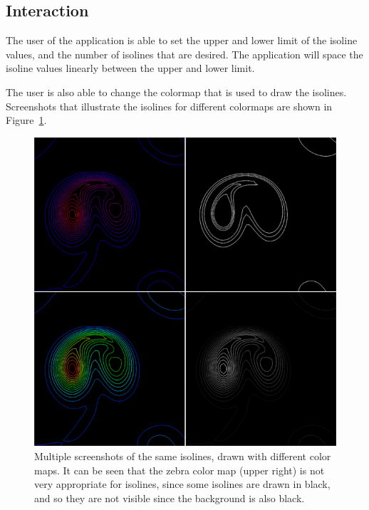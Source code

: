 \subsection{Interaction}
The user of the application is able to set the upper and lower limit of the isoline values, and the number of isolines that are desired.
The application will space the isoline values linearly between the upper and lower limit.

The user is also able to change the colormap that is used to draw the isolines.
Screenshots that illustrate the isolines for different colormaps are shown in Figure~\ref{fig:iso_different_colormaps}.

\begin{figure}[htb]
  \centering
  \includegraphics[width=\linewidth]{./content/pictures/isolines.png}
  \caption{Multiple screenshots of the same isolines, drawn with different color maps. It can be seen that the zebra color map (upper right) is not very appropriate for isolines, since some isolines are drawn in black, and so they are not visible since the background is also black.}
  \label{fig:iso_different_colormaps}
\end{figure}
\clearpage